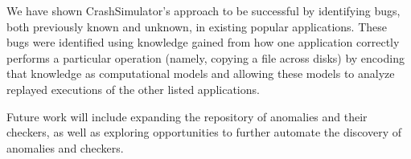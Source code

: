 We have shown CrashSimulator's approach to be successful by identifying bugs, both previously known and unknown, in
existing popular applications.  These bugs were identified using knowledge gained from how one application correctly
performs a particular operation (namely, copying a file across disks) by encoding that knowledge as computational models
and allowing these models to analyze replayed executions of the other listed applications.

Future work will include expanding the repository of anomalies and their checkers, as well as exploring opportunities to further automate the discovery of anomalies and checkers.
